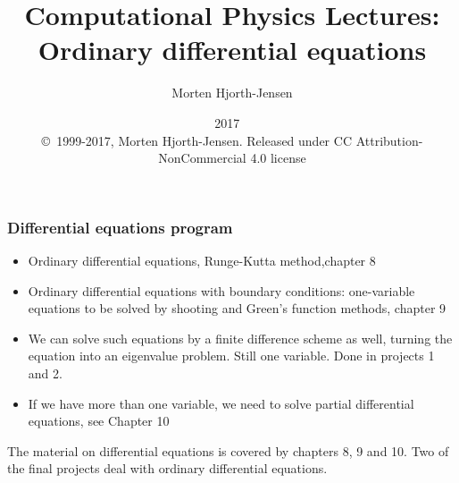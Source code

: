 \documentclass{beamer}
\begin{document}

\newcommand{\exercisesection}[1]{\subsection*{#1}}







\title{Computational Physics  Lectures: Ordinary differential equations}


\author{Morten Hjorth-Jensen}

\date{2017
\ \\ 
{\tiny \copyright\ 1999-2017, Morten Hjorth-Jensen. Released under CC Attribution-NonCommercial 4.0 license}
}

\begin{frame}
\titlepage
\end{frame}

\begin{frame}
\frametitle{Differential equations program}

\begin{block}{}
\begin{itemize}
 \item Ordinary differential equations, Runge-Kutta method,chapter 8

 \item Ordinary differential equations with boundary conditions: one-variable equations to be solved by shooting and Green's function methods, chapter 9

 \item We can solve such equations by a finite difference scheme as well, turning the equation into an eigenvalue problem. Still one variable. Done in projects 1 and 2.

 \item If we have more than one variable, we need to solve  partial differential equations, see Chapter 10
\end{itemize}

\noindent
The material on differential equations is covered by chapters 8, 9 and 10.
Two of  the final projects deal with ordinary differential equations. 
\end{block}
\end{frame}
\end{document}
